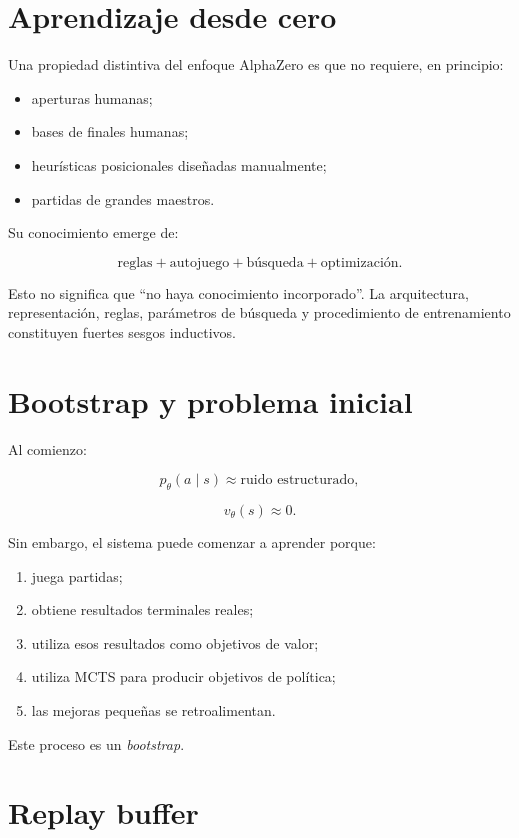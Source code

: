 \documentclass[11pt,a4paper]{article}
\begin{document}
\section{Aprendizaje desde cero}

Una propiedad distintiva del enfoque AlphaZero es que no requiere, en principio:

\begin{itemize}
    \item aperturas humanas;
    \item bases de finales humanas;
    \item heurísticas posicionales diseñadas manualmente;
    \item partidas de grandes maestros.
\end{itemize}

Su conocimiento emerge de:

\[
\text{reglas}
+
\text{autojuego}
+
\text{búsqueda}
+
\text{optimización}.
\]

Esto no significa que ``no haya conocimiento incorporado''. La arquitectura, representación, reglas, parámetros de búsqueda y procedimiento de entrenamiento constituyen fuertes sesgos inductivos.

\section{Bootstrap y problema inicial}

Al comienzo:

\[
p_\theta(a\mid s)
\approx
\text{ruido estructurado},
\]

\[
v_\theta(s)
\approx
0.
\]

Sin embargo, el sistema puede comenzar a aprender porque:

\begin{enumerate}
    \item juega partidas;
    \item obtiene resultados terminales reales;
    \item utiliza esos resultados como objetivos de valor;
    \item utiliza MCTS para producir objetivos de política;
    \item las mejoras pequeñas se retroalimentan.
\end{enumerate}

Este proceso es un \emph{bootstrap}.

\section{Replay buffer}
\end{document}
